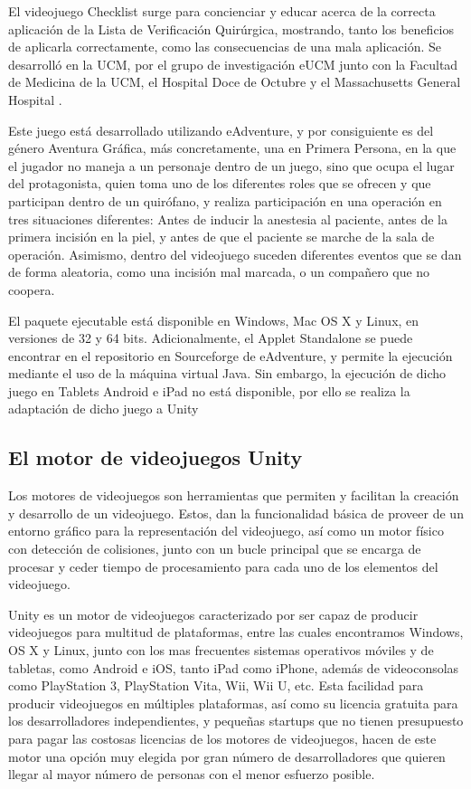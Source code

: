 El videojuego Checklist surge para concienciar y educar acerca de la correcta aplicación de la Lista de Verificación Quirúrgica, mostrando, tanto los beneficios de aplicarla correctamente, como las consecuencias de una mala aplicación. Se desarrolló en la UCM, por el grupo de investigación eUCM junto con la Facultad de Medicina de la UCM, el Hospital Doce de Octubre y el Massachusetts General Hospital \cite{checklisteucm}.

Este juego está desarrollado utilizando eAdventure, y por consiguiente es del género Aventura Gráfica, más concretamente, una en Primera Persona, en la que el jugador no maneja a un personaje dentro de un juego, sino que ocupa el lugar del protagonista, quien toma uno de los diferentes roles que se ofrecen y que participan dentro de un quirófano, y realiza participación en una operación en tres situaciones diferentes: Antes de inducir la anestesia al paciente, antes de la primera incisión en la piel, y antes de que el paciente se marche de la sala de operación. Asimismo, dentro del videojuego suceden diferentes eventos que se dan de forma aleatoria, como una incisión mal marcada, o un compañero que no coopera.

El paquete ejecutable está disponible en Windows, Mac OS X y Linux, en versiones de 32 y 64 bits. Adicionalmente, el Applet Standalone se puede encontrar en el repositorio en Sourceforge de eAdventure, y permite la ejecución mediante el uso de la máquina virtual Java. Sin embargo, la ejecución de dicho juego en Tablets Android e iPad no está disponible, por ello se realiza la adaptación de dicho juego a Unity 

\subsection{El motor de videojuegos Unity}

Los motores de videojuegos son herramientas que permiten y facilitan la creación y desarrollo de un videojuego. Estos, dan la funcionalidad básica de proveer de un entorno gráfico para la representación del videojuego, así como un motor físico con detección de colisiones, junto con un bucle principal que se encarga de procesar y ceder tiempo de procesamiento para cada uno de los elementos del videojuego.

Unity es un motor de videojuegos caracterizado por ser capaz de producir videojuegos para multitud de plataformas, entre las cuales encontramos Windows, OS X y Linux, junto con los mas frecuentes sistemas operativos móviles y de tabletas, como Android e  iOS, tanto iPad como iPhone, además de videoconsolas como PlayStation 3, PlayStation Vita, Wii, Wii U, etc. Esta facilidad para producir videojuegos en múltiples plataformas, así como su licencia gratuita para los desarrolladores independientes, y pequeñas startups que no tienen presupuesto para pagar las costosas licencias de los motores de videojuegos, hacen de este motor una opción muy elegida por gran número de desarrolladores que quieren llegar al mayor número de personas con el menor esfuerzo posible.

